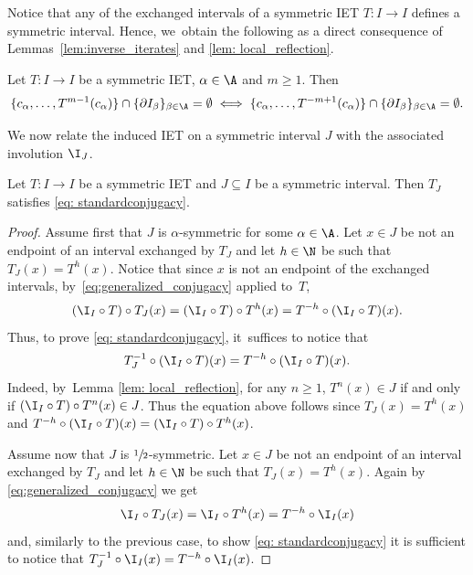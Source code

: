 Notice that any of the exchanged intervals of a symmetric IET $T: I \to I$ defines a symmetric interval. Hence, we~obtain the following as a direct consequence of Lem\-mas~\ref{lem:inverse_iterates} and \ref{lem: local_reflection}.

\begin{corollary}
Let $T : I \to I$ be a symmetric IET, $\alpha \in \A$ and $m \geq 1$. Then\vspace*{-3pt}
\[
\{c_\alpha, \ldots, T^{m - 1}(c_\alpha)\} \cap \{\partial I_\beta\}_{\beta \in \A} = \emptyset\iff \{c_\alpha, \ldots, T^{-m + 1}(c_\alpha)\} \cap \{\partial I_\beta\}_{\beta \in \A} = \emptyset.
\]
\end{corollary}

We now relate the induced IET on a symmetric interval $J$ with the associated involution $\I_J$.

\begin{lemma}
\label{lem:symmetric_condition}
Let $T : I \to I$ be a symmetric IET and $J \subseteq I$ be a symmetric interval. Then $T_J$ satisfies \eqref{eq: standardconjugacy}.\end{lemma}

\begin{proof}
Assume first that $J$ is $\alpha$-symmetric for some $\alpha\in\A$. Let $x\in J$ be not an endpoint of an interval exchanged by $T_J$ and let $h\in\N$ be such that $T_J(x)=T^{h}(x)$. Notice that since $x$ is not an endpoint of the exchanged intervals, by~\eqref{eq:generalized_conjugacy} applied to~$T$,\vspace*{-3pt}
\[
{(\I_I\circ T)\circ T_{J}(x)} = (\I_I\circ T) \circ T^h(x)=T^{-h}\circ (\I_I\circ T)(x).
\]
Thus, to prove \eqref{eq: standardconjugacy}, it~suffices to notice that\vspace*{-3pt}
\[
T_{J}^{-1}\circ (\I_I\circ T)(x) = T^{-h}\circ (\I_I\circ T)(x).
\]
Indeed, by~Lemma \ref{lem: local_reflection}, for any $n \geq 1$, $T^n(x) \in J$ if and only if $(\I_I\circ T) \circ T^n(x) \in J$. Thus the equation above follows since $T_J(x)=T^{h}(x)$ and $T^{-h}\circ (\I_I\circ T)(x) = (\I_I\circ T) \circ T^h(x)$.

Assume now that $J$ is $\sfrac{1}{2}$-symmetric. Let $x\in J$ be not an endpoint of an interval exchanged by $T_J$ and let $h\in\N$ be such that $T_J(x)=T^{h}(x)$. Again by \eqref{eq:generalized_conjugacy} we get\vspace*{-3pt}
\[
\I_I\circ T_{J}(x) = \I_I\circ T^h(x)=T^{-h}\circ \I_I(x)
\]
and, similarly to the previous case, to show \eqref{eq: standardconjugacy} it is sufficient to notice that $T_{J}^{-1}\circ\nobreak\I_I(x)=T^{-h}\circ\I_I(x)$.
\end{proof}

